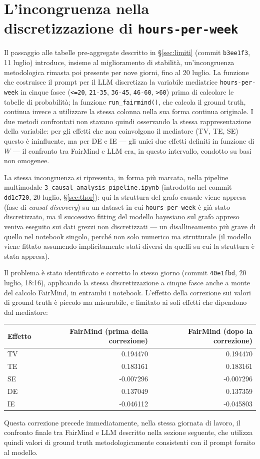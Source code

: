 \section{L'incongruenza nella discretizzazione di \texttt{hours-per-week}}
\label{sec:binning}

Il passaggio alle tabelle pre-aggregate descritto in \S\ref{sec:limiti} (commit \texttt{b3ee1f3}, 11 luglio) introduce, insieme al miglioramento di stabilità, un'incongruenza metodologica rimasta poi presente per nove giorni, fino al 20 luglio. La funzione che costruisce il prompt per il LLM discretizza la variabile mediatrice \texttt{hours-per-week} in cinque fasce (\texttt{<=20}, \texttt{21-35}, \texttt{36-45}, \texttt{46-60}, \texttt{>60}) prima di calcolare le tabelle di probabilità; la funzione \texttt{run\_fairmind()}, che calcola il ground truth, continua invece a utilizzare la stessa colonna nella sua forma continua originale. I due metodi confrontati non stavano quindi osservando la stessa rappresentazione della variabile: per gli effetti che non coinvolgono il mediatore (TV, TE, SE) questo è ininfluente, ma per DE e IE --- gli unici due effetti definiti in funzione di $W$ --- il confronto tra FairMind e LLM era, in questo intervallo, condotto su basi non omogenee.

La stessa incongruenza si ripresenta, in forma più marcata, nella pipeline multimodale \texttt{3\_causal\_analysis\_pipeline.ipynb} (introdotta nel commit \texttt{dd1c720}, 20 luglio, \S\ref{sec:thor}): qui la struttura del grafo causale viene appresa (fase di \emph{causal discovery}) su un dataset in cui \texttt{hours-per-week} è già stato discretizzato, ma il successivo fitting del modello bayesiano sul grafo appreso veniva eseguito sui dati grezzi non discretizzati --- un disallineamento più grave di quello nel notebook singolo, perché non solo numerico ma strutturale (il modello viene fittato assumendo implicitamente stati diversi da quelli su cui la struttura è stata appresa).

Il problema è stato identificato e corretto lo stesso giorno (commit \texttt{40e1fbd}, 20 luglio, 18:16), applicando la stessa discretizzazione a cinque fasce anche a monte del calcolo FairMind, in entrambi i notebook. L'effetto della correzione sui valori di ground truth è piccolo ma misurabile, e limitato ai soli effetti che dipendono dal mediatore:

\begin{center}
\begin{tabular}{lrr}
\toprule
Effetto & FairMind (prima della correzione) & FairMind (dopo la correzione) \\
\midrule
TV & 0.194470 & 0.194470 \\
TE & 0.183161 & 0.183161 \\
SE & -0.007296 & -0.007296 \\
DE & 0.137049 & 0.137359 \\
IE & -0.046112 & -0.045803 \\
\bottomrule
\end{tabular}
\end{center}

Questa correzione precede immediatamente, nella stessa giornata di lavoro, il confronto finale tra FairMind e LLM descritto nella sezione seguente, che utilizza quindi valori di ground truth metodologicamente consistenti con il prompt fornito al modello.

